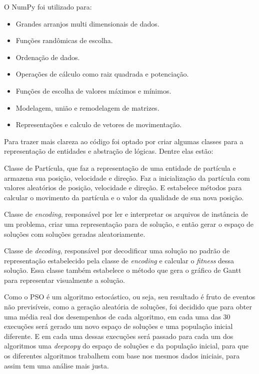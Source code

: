         \hfill\newline
        \noindent O NumPy foi utilizado para: 
        \begin{itemize}
            \item Grandes arranjos multi dimensionais de dados. 
            \item Funções randômicas de escolha.
            \item Ordenação de dados.
            \item Operações de cálculo como raiz quadrada e potenciação.
            \item Funções de escolha de valores máximos e mínimos.
            \item Modelagem, união e remodelagem de matrizes.
            \item Representações e calculo de vetores de movimentação.
        \end{itemize}
        
        \hfill\newline
        Para trazer mais clareza ao código foi optado por criar algumas classes para a representação de entidades e abstração de lógicas. Dentre elas estão:\hfill\vspace{\onelineskip}
        
        Classe de Partícula, que faz a representação de uma entidade de partícula e armazena sua posição, velocidade e direção. Faz a inicialização da partícula com valores aleatórios de posição, velocidade e direção. E estabelece métodos para calcular o movimento da partícula e o valor da qualidade de sua nova posição.\hfill\vspace{\onelineskip}
        
        Classe de \textit{encoding}, responsável por ler e interpretar os arquivos de instância de um problema, criar uma representação para de solução, e então gerar o espaço de soluções com soluções geradas aleatoriamente.\hfill\vspace{\onelineskip}
         
        Classe de \textit{decoding}, responsável por decodificar uma solução no padrão de representação estabelecido pela classe de \textit{encoding} e calcular o \textit{fitness} dessa solução. Essa classe também estabelece o método que gera o gráfico de Gantt para representar visualmente a solução.\hfill\vspace{\onelineskip}

        Como o PSO é um algoritmo estocástico, ou seja, seu resultado é fruto de eventos não previsíveis, como a geração aleatória de soluções, foi decidido que para obter uma média real dos desempenhos de cada algoritmo, em cada uma das 30 execuções será gerado um novo espaço de soluções e uma população inicial diferente.\newline
        E em cada uma dessas execuções será passado para cada um dos algoritmos uma \textit{deepcopy} do espaço de soluções e da população inicial, para que os diferentes algoritmos trabalhem com base nos mesmos dados iniciais, para assim tem uma análise mais justa.\hfill\vspace{\onelineskip}

